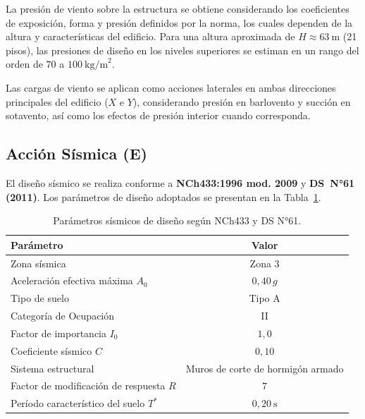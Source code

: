 La presión de viento sobre la estructura se obtiene considerando los coeficientes de exposición, forma y presión definidos por la norma, los cuales dependen de la altura y características del edificio. Para una altura aproximada de $H \approx 63\ \text{m}$ (21 pisos), las presiones de diseño en los niveles superiores se estiman en un rango del orden de $70$ a $100\ \text{kg/m}^2$.

Las cargas de viento se aplican como acciones laterales en ambas direcciones principales del edificio ($X$ e $Y$), considerando presión en barlovento y succión en sotavento, así como los efectos de presión interior cuando corresponda.

\subsection{Acción Sísmica (E)}

El diseño sísmico se realiza conforme a \textbf{NCh433:1996 mod. 2009} y \textbf{DS~N°61 (2011)}. Los parámetros de diseño adoptados se presentan en la Tabla~\ref{tab:parametros_sismicos}.

\begin{table}[H]
    \centering
    \caption{Parámetros sísmicos de diseño según NCh433 y DS N°61.}
    \label{tab:parametros_sismicos}
    \begin{tabular}{lc}
        \hline
        \textbf{Parámetro} & \textbf{Valor} \\
        \hline
        Zona sísmica                                    & Zona 3 \\
        Aceleración efectiva máxima $A_0$               & $0{,}40\,g$ \\
        Tipo de suelo                                   & Tipo A \\
        Categoría de Ocupación                         & II \\
        Factor de importancia $I_0$                    & $1{,}0$ \\
        Coeficiente sísmico $C$                        & $0{,}10$ \\
        Sistema estructural                             & Muros de corte de hormigón armado \\
        Factor de modificación de respuesta $R$        & $7$ \\
        Período característico del suelo $T^*$         & $0{,}20\ \text{s}$ \\
        \hline
    \end{tabular}
\end{table}

